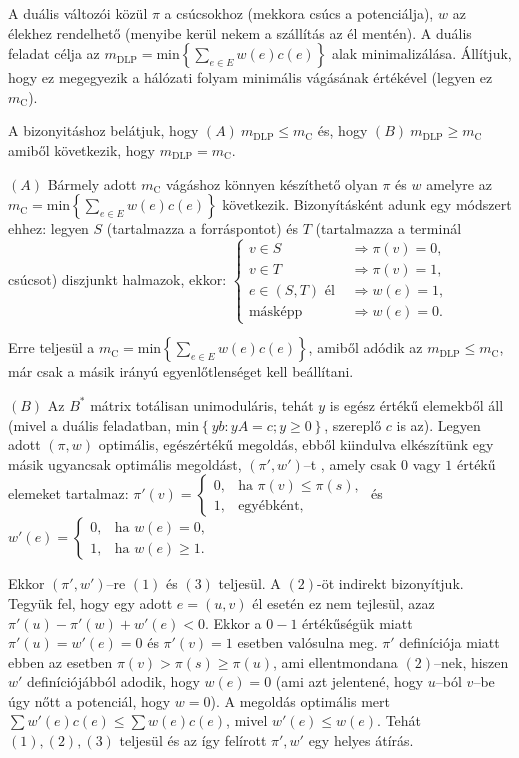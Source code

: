 A duális változói közül $\pi$ a csúcsokhoz (mekkora csúcs a potenciálja), $w$ az
élekhez rendelhető (menyibe kerül nekem a szállítás az él mentén). A duális
feladat célja az $m_{\text{DLP}}= \mbox{min} \left\{ \sum_{e\in E}^{}
w(e)c(e)\right\}$ alak minimalizálása. Állítjuk, hogy ez megegyezik a hálózati
folyam minimális vágásának értékével (legyen ez $m_{\text{C}}$). 

A bizonyitáshoz belátjuk, hogy $(A)~m_{\mbox{DLP}} \leq m_{\mbox{C}}$ és, hogy
$(B)~m_{\mbox{DLP}} \geq m_{\mbox{C}}$ amiből következik, hogy $ m_{\mbox{DLP}}
= m_{\mbox{C}}$.

$(A)$ Bármely adott $m_{\mbox{C}}$ vágáshoz könnyen készíthető olyan $\pi$ és $w$
amelyre az $m_{\text{C}}= \mbox{min} \left\{ \sum_{e\in E}^{} w(e)c(e)\right\}$
következik. Bizonyításként adunk egy módszert ehhez: legyen $S$ (tartalmazza a
forráspontot) és $T$ (tartalmazza a terminál csúcsot) diszjunkt halmazok, ekkor:
$\begin{cases}
v \in S &\Rightarrow \pi(v)=0, \\
v \in T &\Rightarrow \pi(v)=1, \\
e \in (S,T) \mbox{ él } &\Rightarrow w(e)=1, \\
\mbox{másképp} &\Rightarrow w(e)=0.
\end{cases}$

Erre teljesül a $m_{\text{C}}= \mbox{min} \left\{ \sum_{e\in E}^{}
w(e)c(e)\right\}$, amiből adódik az $m_{\mbox{DLP}} \leq m_{\mbox{C}}$, már csak
a másik irányú egyenlőtlenséget kell beállítani. 

$(B)$ Az $B^*$ mátrix totálisan unimoduláris, tehát $y$ is egész értékű elemekből
áll (mivel a duális feladatban, min$\left\{ yb:yA=c; y\geq 0 \right\}$, szereplő
$c$ is az). Legyen adott $(\pi,w)$ optimális, egészértékű megoldás, ebből
kiindulva elkészítünk egy másik ugyancsak optimális megoldást, $(\pi',w')$--t
, amely csak $0$ vagy $1$ értékű elemeket tartalmaz:
$\pi'(v)=
\begin{cases}
0, &\mbox{ha } \pi(v) \leq \pi(s), \\
1, &\mbox{egyébként},
\end{cases}$ és
$w'(e)=
\begin{cases}
0, &\mbox{ha } w(e)=0, \\
1, &\mbox{ha } w(e) \geq 1.
\end{cases}$

Ekkor $(\pi',w')$--re $(1)$ és $(3)$ teljesül. A $(2)$-öt indirekt bizonyítjuk.
Tegyük fel, hogy egy adott $e=(u,v)$ él esetén ez nem tejlesül, azaz
$\pi'(u)-\pi'(w)+w'(e)<0$. Ekkor a $0-1$ értékűségük miatt $\pi'(u)=w'(e)=0$ és
$\pi'(v)=1$ esetben valósulna meg. $\pi'$ definíciója miatt ebben az esetben
$\pi(v) > \pi(s) \geq \pi(u)$, ami ellentmondana $(2)$--nek, hiszen $w'$
definíciójábból adodik, hogy $w(e)=0$ (ami azt jelentené, hogy $u$--ból $v$--be
úgy nőtt a potenciál, hogy $w=0$). A megoldás optimális mert $\sum w'(e)c(e)
\leq \sum w(e)c(e)$, mivel $w'(e) \leq w(e)$. Tehát $(1), (2), (3)$ teljesül és az így
felírott $\pi', w'$ egy helyes átírás.

